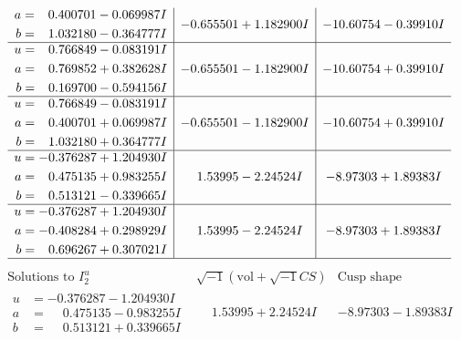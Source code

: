 \documentclass[1p]{elsarticle_modified}
\theoremstyle{definition}
\newcommand{\I}{\sqrt{-1}}
\begin{document}
$$\begin{array}{c|c|c}
\begin{aligned}
a &= \phantom{-}0.400701 - 0.069987 I \\
b &= \phantom{-}1.032180 - 0.364777 I\end{aligned}
 & -0.655501 + 1.182900 I & -10.60754 - 0.39910 I \\ \hline\begin{aligned}
u &= \phantom{-}0.766849 - 0.083191 I \\
a &= \phantom{-}0.769852 + 0.382628 I \\
b &= \phantom{-}0.169700 - 0.594156 I\end{aligned}
 & -0.655501 - 1.182900 I & -10.60754 + 0.39910 I \\ \hline\begin{aligned}
u &= \phantom{-}0.766849 - 0.083191 I \\
a &= \phantom{-}0.400701 + 0.069987 I \\
b &= \phantom{-}1.032180 + 0.364777 I\end{aligned}
 & -0.655501 - 1.182900 I & -10.60754 + 0.39910 I \\ \hline\begin{aligned}
u &= -0.376287 + 1.204930 I \\
a &= \phantom{-}0.475135 + 0.983255 I \\
b &= \phantom{-}0.513121 - 0.339665 I\end{aligned}
 & \phantom{-}1.53995 - 2.24524 I & -8.97303 + 1.89383 I \\ \hline\begin{aligned}
u &= -0.376287 + 1.204930 I \\
a &= -0.408284 + 0.298929 I \\
b &= \phantom{-}0.696267 + 0.307021 I\end{aligned}
 & \phantom{-}1.53995 - 2.24524 I & -8.97303 + 1.89383 I\\
 \hline 
 \end{array}$$\newpage$$\begin{array}{c|c|c}  
\text{Solutions to }I^u_{2}& \I (\text{vol} + \sqrt{-1}CS) & \text{Cusp shape}\\
 \hline 
\begin{aligned}
u &= -0.376287 - 1.204930 I \\
a &= \phantom{-}0.475135 - 0.983255 I \\
b &= \phantom{-}0.513121 + 0.339665 I\end{aligned}
 & \phantom{-}1.53995 + 2.24524 I & -8.97303 - 1.89383 I \\ \hline\begin{aligned}

\end{aligned}
\end{array}$$
\end{document}
